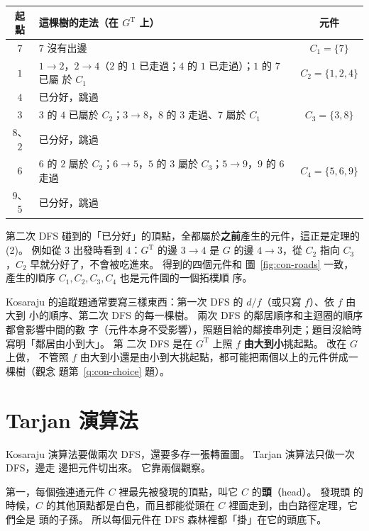 \begin{center}
\small
\begin{tabular}{clc}
\toprule
起點 & 這棵樹的走法（在 $G^{\mathrm{T}}$ 上） & 元件 \\
\midrule
$7$ & $7$ 沒有出邊 & $C_1 = \{7\}$ \\
$1$ & $1 \to 2$，$2 \to 4$（$2$ 的 $1$ 已走過；$4$ 的 $1$ 已走過）；$1$ 的 $7$ 已屬
於 $C_1$ & $C_2 = \{1, 2, 4\}$ \\
$4$ & 已分好，跳過 & \\
$3$ & $3$ 的 $4$ 已屬於 $C_2$；$3 \to 8$，$8$ 的 $3$ 走過、$7$ 屬於 $C_1$ & $C_3 =
\{3, 8\}$ \\
$8$、$2$ & 已分好，跳過 & \\
$6$ & $6$ 的 $2$ 屬於 $C_2$；$6 \to 5$，$5$ 的 $3$ 屬於 $C_3$；$5 \to 9$，$9$ 的 $6$
走過 & $C_4 = \{5, 6, 9\}$ \\
$9$、$5$ & 已分好，跳過 & \\
\bottomrule
\end{tabular}
\end{center}

第二次 DFS 碰到的「已分好」的頂點，全都屬於\textbf{之前}產生的元件，這正是定理的
(2)。 例如從 $3$ 出發時看到 $4$：$G^{\mathrm{T}}$ 的邊 $3 \to 4$ 是 $G$ 的邊 $4 \to
3$，從 $C_2$ 指向 $C_3$，$C_2$ 早就分好了，不會被吃進來。 得到的四個元件和
圖~\ref{fig:con-roads} 一致，產生的順序 $C_1, C_2, C_3, C_4$ 也是元件圖的一個拓樸順
序。

\begin{examnote}
Kosaraju 的追蹤題通常要寫三樣東西：第一次 DFS 的 $d/f$（或只寫 $f$）、依 $f$ 由大到
小的順序、第二次 DFS 的每一棵樹。 兩次 DFS 的鄰居順序和主迴圈的順序都會影響中間的數
字（元件本身不受影響），照題目給的鄰接串列走；題目沒給時寫明「鄰居由小到大」。 第
二次 DFS 是在 $G^{\mathrm{T}}$ 上照 $f$ \textbf{由大到小}挑起點。 改在 $G$ 上做，
不管照 $f$ 由大到小還是由小到大挑起點，都可能把兩個以上的元件併成一棵樹（觀念
題第~\ref{q:con-choice} 題）。
\end{examnote}

\section{Tarjan 演算法}
\label{sec:con-tarjan}

Kosaraju 演算法要做兩次 DFS，還要多存一張轉置圖。 Tarjan 演算法只做一次 DFS，邊走
邊把元件切出來。 它靠兩個觀察。

第一，每個強連通元件 $C$ 裡最先被發現的頂點，叫它 $C$ 的\textbf{頭}（head）。 發現頭
的時候，$C$ 的其他頂點都是白色，而且都能從頭在 $C$ 裡面走到，由白路徑定理，它們全是
頭的子孫。 所以每個元件在 DFS 森林裡都「掛」在它的頭底下。

